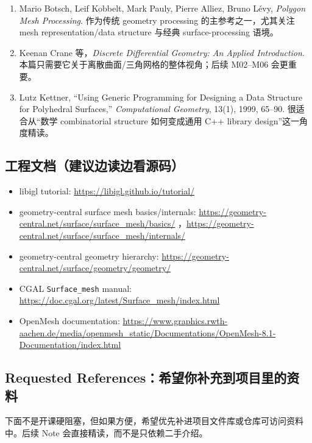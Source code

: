 \documentclass[UTF8,11pt]{ctexart}
\newcommand{\cgalSurfaceMesh}{\texttt{Surface\_mesh}}
\begin{document}
\begin{enumerate}
  \item Mario Botsch, Leif Kobbelt, Mark Pauly, Pierre Alliez, Bruno L\'evy, \emph{Polygon Mesh Processing}. 作为传统 geometry processing 的主参考之一，尤其关注 mesh representation/data structure 与经典 surface-processing 语境。

  \item Keenan Crane 等，\emph{Discrete Differential Geometry: An Applied Introduction}. 本篇只需要它关于离散曲面/三角网格的整体视角；后续 M02--M06 会更重要。

  \item Lutz Kettner, ``Using Generic Programming for Designing a Data Structure for Polyhedral Surfaces,'' \emph{Computational Geometry}, 13(1), 1999, 65--90. 很适合从“数学 combinatorial structure 如何变成通用 C++ library design”这一角度精读。
\end{enumerate}

\subsection*{工程文档（建议边读边看源码）}

\begin{itemize}
  \item libigl tutorial: \url{https://libigl.github.io/tutorial/}
  \item geometry-central surface mesh basics/internals: \url{https://geometry-central.net/surface/surface_mesh/basics/} ，\url{https://geometry-central.net/surface/surface_mesh/internals/}
  \item geometry-central geometry hierarchy: \url{https://geometry-central.net/surface/geometry/geometry/}
  \item CGAL \cgalSurfaceMesh{} manual: \url{https://doc.cgal.org/latest/Surface_mesh/index.html}
  \item OpenMesh documentation: \url{https://www.graphics.rwth-aachen.de/media/openmesh_static/Documentations/OpenMesh-8.1-Documentation/index.html}
\end{itemize}

\subsection*{Requested References：希望你补充到项目里的资料}

下面不是开课硬阻塞，但如果方便，希望优先补进项目文件库或仓库可访问资料中。后续 Note 会直接精读，而不是只依赖二手介绍。
\end{document}
